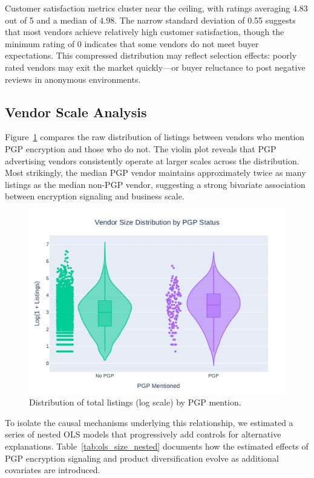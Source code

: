 \documentclass{article}
\begin{document}
Customer satisfaction metrics cluster near the ceiling, with ratings averaging 4.83 out of 5 and a median of 4.98. The narrow standard deviation of 0.55 suggests that most vendors achieve relatively high customer satisfaction, though the minimum rating of 0 indicates that some vendors do not meet buyer expectations. This compressed distribution may reflect selection effects: poorly rated vendors may exit the market quickly—or buyer reluctance to post negative reviews in anonymous environments.

\subsection{Vendor Scale Analysis}

Figure~\ref{fig:box_pgp} compares the raw distribution of listings between vendors who mention PGP encryption and those who do not. The violin plot reveals that PGP advertising vendors consistently operate at larger scales across the distribution. Most strikingly, the median PGP vendor maintains approximately twice as many listings as the median non-PGP vendor, suggesting a strong bivariate association between encryption signaling and business scale.

\begin{figure}[htbp]
  \centering
  \includegraphics[width=.75\textwidth]{violin_pgp_size.pdf}
  \caption{Distribution of total listings (log scale) by PGP mention.}
  \label{fig:box_pgp}
\end{figure}

To isolate the causal mechanisms underlying this relationship, we estimated a series of nested OLS models that progressively add controls for alternative explanations. Table~\ref{tab:ols_size_nested} documents how the estimated effects of PGP encryption signaling and product diversification evolve as additional covariates are introduced.
\end{document}
